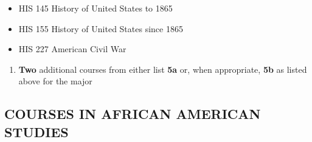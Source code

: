 \documentclass[
  letterpaper,
]{scrbook}
\providecommand{\tightlist}{%
  \setlength{\itemsep}{0pt}\setlength{\parskip}{0pt}}
\begin{document}
\begin{itemize}
\tightlist
\item
  HIS 145 History of United States to 1865
\item
  HIS 155 History of United States since 1865
\item
  HIS 227 American Civil War
\end{itemize}

\begin{enumerate}
\def\labelenumi{\arabic{enumi}.}
\setcounter{enumi}{4}
\tightlist
\item
  \textbf{Two} additional courses from either list \textbf{5a} or, when
  appropriate, \textbf{5b} as listed above for the major
\end{enumerate}

\subsection{COURSES IN AFRICAN AMERICAN
STUDIES}\label{sec-courses-in-african-american-studies}
\end{document}
